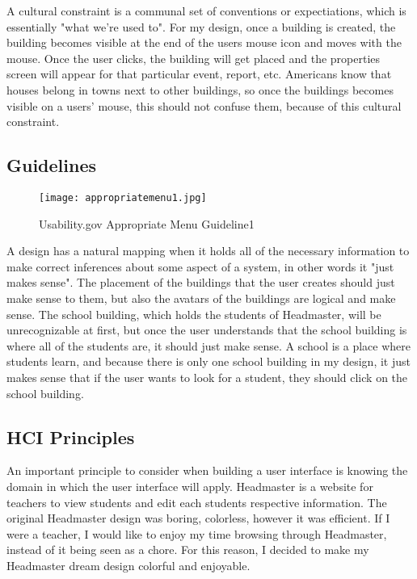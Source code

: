 \documentclass[11pt]{article}
\begin{document}
A cultural constraint is a communal set of conventions or expectiations, which is essentially "what we're used to". For my design, once a building is created, the building becomes visible at the end of the users mouse icon and moves with the mouse. Once the user clicks, the building will get placed and the properties screen will appear for that particular event, report, etc. Americans know that houses belong in towns next to other buildings, so once the buildings becomes visible on a users' mouse, this should not confuse them, because of this cultural constraint. 

\subsection{Guidelines}
\begin{figure}[h]
\centering
\texttt{[image: appropriatemenu1.jpg]}
\caption{Usability.gov Appropriate Menu Guideline1}
\label{menu1}
\end{figure}

A design has a natural mapping when it holds all of the necessary information to make correct inferences about some aspect of a system, in other words it "just makes sense". The placement of the buildings that the user creates should just make sense to them, but also the avatars of the buildings are logical and make sense. The school building, which holds the students of Headmaster, will be unrecognizable at first, but once the user understands that the school building is where all of the students are, it should just make sense. A school is a place where students learn, and because there is only one school building in my design, it just makes sense that if the user wants to look for a student, they should click on the school building. 

\subsection{HCI Principles}
An important principle to consider when building a user interface is knowing the domain in which the user interface will apply. Headmaster is a website for teachers to view students and edit each students respective information. The original Headmaster design was boring, colorless, however it was efficient. If I were a teacher, I would like to enjoy my time browsing through Headmaster, instead of it being seen as a chore. For this reason, I decided to make my Headmaster dream design colorful and enjoyable. 
\end{document}
